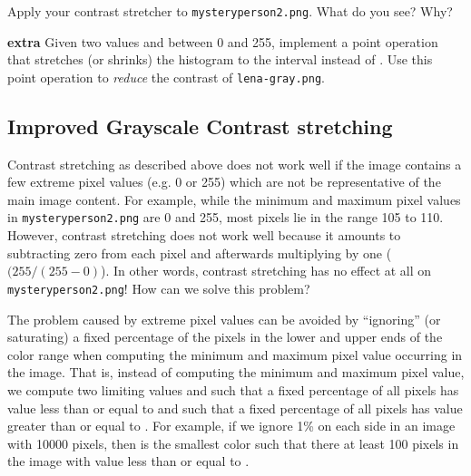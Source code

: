 \documentclass{book}
\begin{document}
\begin{exercise}
Apply your contrast stretcher to \texttt{mysteryperson2.png}. What do you see? Why?
\end{exercise}

\begin{exercise}
\textbf{extra} Given two values  and  between 0 and 255, implement a point operation that stretches (or shrinks) the histogram to the interval  instead of . Use this point operation to \emph{reduce} the contrast of \texttt{lena-gray.png}.
\end{exercise}

\subsection*{Improved Grayscale Contrast stretching}
Contrast stretching as described above does not work well if the image contains a few extreme pixel values (e.g. 0 or 255) which are not be representative of the main image content. For example, while the minimum and maximum pixel values in \texttt{mysteryperson2.png} are 0 and 255, most pixels lie in the range 105 to 110. However, contrast stretching does not work well because it amounts to subtracting zero from each pixel and afterwards multiplying by one ($(255 / (255 - 0)$). In other words, contrast stretching has no effect at all on \texttt{mysteryperson2.png}! How can we solve this problem?

The problem caused by extreme pixel values can be avoided by ``ignoring'' (or saturating) a fixed percentage of the pixels in the lower and upper ends of the color range when computing the minimum and maximum pixel value occurring in the image. That is, instead of computing the minimum and maximum pixel value, we compute two limiting values  and  such that a fixed percentage of all pixels has value less than or equal to  and such that a fixed percentage of all pixels has value greater than or equal to .  For example, if we ignore 1\% on each side in an image with 10000 pixels, then  is the smallest color such that there at least 100 pixels in the image with value less than or equal to . 
\end{document}
